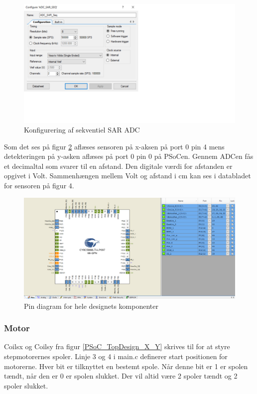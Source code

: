 \begin{figure}[H]
\includegraphics[scale=0.7]{Screenshots/ADC_SAR_SEQ.png}
\caption{Konfigurering af sekventiel SAR ADC}
\label{ADC_SAR_SEQ}
\end{figure}

Som det ses på figur \ref{PSoC_X_Y_pin_configuration} aflæses sensoren på x-aksen på port 0 pin 4 mens detekteringen på y-asken aflæses på port 0 pin 0 på PSoCen. Gennem ADCen fås et decimaltal som svarer til en afstand. Den digitale værdi for afstanden er opgivet i Volt. Sammenhængen mellem Volt og afstand i cm kan ses i databladet for sensoren på figur 4.

\begin{figure}[H]
\includegraphics[scale=0.22]{Screenshots/PSoC_X_Y_pin_configuration.png}
\caption{Pin diagram for hele designets komponenter}
\label{PSoC_X_Y_pin_configuration}
\end{figure}

\subsubsection{Motor}
Coils\textunderscore x og Coils\textunderscore y fra figur \ref{PSoC_TopDesign_X_Y} skrives til for at styre stepmotorernes spoler. Linje 3 og 4 i main.c definerer start positionen for motorerne. Hver bit er tilknyttet en bestemt spole. Når denne bit er 1 er spolen tændt, når den er 0 er spolen slukket. Der vil altid være 2 spoler tændt og 2 spoler slukket.

